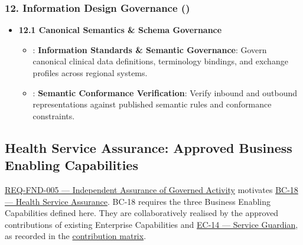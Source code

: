 \subsubsection*{12. Information Design Governance (\texttt{})}
\label{rad:enabling:668}

\begin{itemize}

\item
\textbf{12.1 Canonical Semantics \& Schema Governance}


\begin{itemize}

\item
\texttt{}: \textbf{Information Standards \& Semantic Governance}: Govern canonical clinical data definitions, terminology bindings, and exchange profiles across regional systems.



\item
\texttt{}: \textbf{Semantic Conformance Verification}: Verify inbound and outbound representations against published semantic rules and conformance constraints.



\end{itemize}


\end{itemize}
\label{rad:enabling:672}

\par\smallskip
{}\label{rad:enabling:674}
\subsection*{Health Service Assurance: Approved Business Enabling Capabilities}
\label{rad:enabling:676}

\href{https://github.com/fhirfactory/harmonia/blob/98410db60155198a75f74c79d98060070209faa1/docs/markdown/01-motivation/requirements-constraints/foundational-requirements.md\#req-fnd-005-independent-assurance-of-governed-activity}{REQ-FND-005 — Independent Assurance of Governed Activity} motivates \hyperref[rad:business:1033]{BC-18 — Health Service Assurance}. BC-18 requires the three Business Enabling Capabilities defined here. They are collaboratively realised by the approved contributions of existing Enterprise Capabilities and \hyperref[rad:enterprise:224]{EC-14 — Service Guardian}, as recorded in the \hyperref[rad:assurance-strategy:54]{contribution matrix}.

